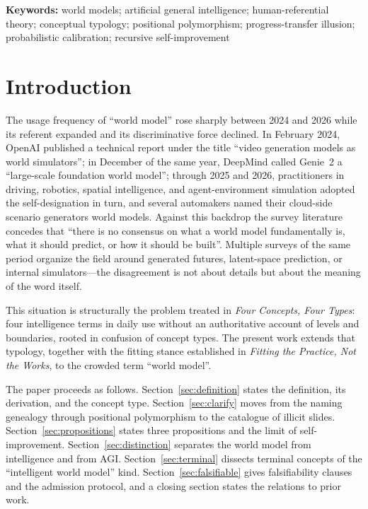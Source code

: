 \documentclass[10pt]{article}
\begin{document}
\medskip
\noindent\textbf{Keywords:} world models; artificial general intelligence; human-referential theory; conceptual typology; positional polymorphism; progress-transfer illusion; probabilistic calibration; recursive self-improvement

\section{Introduction}\label{sec:intro}

The usage frequency of ``world model'' rose sharply between 2024 and 2026 while its referent expanded and its discriminative force declined. In February 2024, OpenAI published a technical report under the title ``video generation models as world simulators''\cite{openai2024sora}; in December of the same year, DeepMind called Genie~2 a ``large-scale foundation world model''\cite{deepmind2024genie2}; through 2025 and 2026, practitioners in driving, robotics, spatial intelligence, and agent-environment simulation adopted the self-designation in turn, and several automakers named their cloud-side scenario generators world models. Against this backdrop the survey literature concedes that ``there is no consensus on what a world model fundamentally is, what it should predict, or how it should be built''\cite{chen2026definition}. Multiple surveys of the same period organize the field around generated futures, latent-space prediction, or internal simulators\cite{ding2024understanding,li2025embodied}---the disagreement is not about details but about the meaning of the word itself.

This situation is structurally the problem treated in \emph{Four Concepts, Four Types}\cite{yu2026fourconcepts}: four intelligence terms in daily use without an authoritative account of levels and boundaries, rooted in confusion of concept types. The present work extends that typology, together with the fitting stance established in \emph{Fitting the Practice, Not the Works}\cite{yu2026fitting}, to the crowded term ``world model''.

The paper proceeds as follows. Section~\ref{sec:definition} states the definition, its derivation, and the concept type. Section~\ref{sec:clarify} moves from the naming genealogy through positional polymorphism to the catalogue of illicit slides. Section~\ref{sec:propositions} states three propositions and the limit of self-improvement. Section~\ref{sec:distinction} separates the world model from intelligence and from AGI. Section~\ref{sec:terminal} dissects terminal concepts of the ``intelligent world model'' kind. Section~\ref{sec:falsifiable} gives falsifiability clauses and the admission protocol, and a closing section states the relations to prior work.
\end{document}
